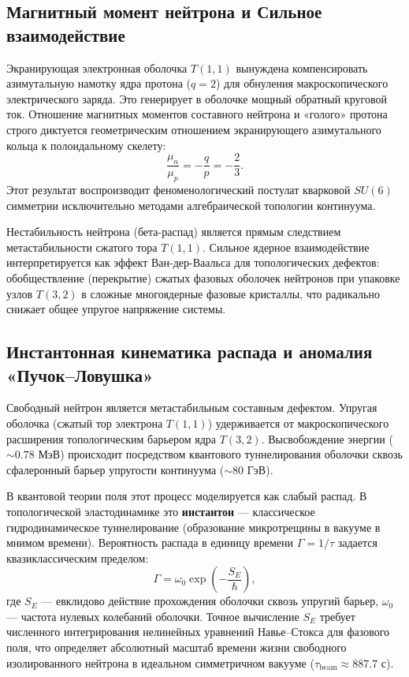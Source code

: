 \documentclass[11pt,a4paper]{article}
\begin{document}
	\subsection{Магнитный момент нейтрона и Сильное взаимодействие}
	Экранирующая электронная оболочка $T(1,1)$ вынуждена компенсировать азимутальную намотку ядра протона ($q=2$) для обнуления макроскопического электрического заряда. Это генерирует в оболочке мощный обратный круговой ток. Отношение магнитных моментов составного нейтрона и «голого» протона строго диктуется геометрическим отношением экранирующего азимутального кольца к полоидальному скелету:
	\begin{equation}
		\frac{\mu_n}{\mu_p} = -\frac{q}{p} = -\frac{2}{3}.
	\end{equation}
	Этот результат воспроизводит феноменологический постулат кварковой $SU(6)$ симметрии исключительно методами алгебраической топологии континуума.
	
	Нестабильность нейтрона (бета-распад) является прямым следствием метастабильности сжатого тора $T(1,1)$. Сильное ядерное взаимодействие интерпретируется как эффект Ван-дер-Ваальса для топологических дефектов: обобществление (перекрытие) сжатых фазовых оболочек нейтронов при упаковке узлов $T(3,2)$ в сложные многоядерные фазовые кристаллы, что радикально снижает общее упругое напряжение системы.

\subsection{Инстантонная кинематика распада и аномалия «Пучок–Ловушка»}
Свободный нейтрон является метастабильным составным дефектом. Упругая оболочка (сжатый тор электрона $T(1,1)$) удерживается от макроскопического расширения топологическим барьером ядра $T(3,2)$. Высвобождение энергии ($\sim 0.78$ МэВ) происходит посредством квантового туннелирования оболочки сквозь сфалеронный барьер упругости континуума ($\sim 80$ ГэВ). 

В квантовой теории поля этот процесс моделируется как слабый распад. В топологической эластодинамике это \textbf{инстантон} — классическое гидродинамическое туннелирование (образование микротрещины в вакууме в мнимом времени). Вероятность распада в единицу времени $\Gamma = 1/\tau$ задается квазиклассическим пределом:
\begin{equation}
	\Gamma = \omega_0 \exp\!\left( -\frac{S_E}{\hbar} \right),
\end{equation}
где $S_E$ — евклидово действие прохождения оболочки сквозь упругий барьер, $\omega_0$ — частота нулевых колебаний оболочки. Точное вычисление $S_E$ требует численного интегрирования нелинейных уравнений Навье–Стокса для фазового поля, что определяет абсолютный масштаб времени жизни свободного изолированного нейтрона в идеальном симметричном вакууме ($\tau_{\text{beam}} \approx 887.7$ с).
\end{document}
